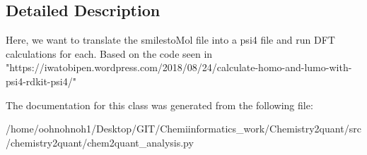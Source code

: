 \subsection{Detailed Description}
\begin{DoxyVerb}Here, we want to translate the smilestoMol file into a psi4 file and run DFT calculations for each.
Based on the code seen in "https://iwatobipen.wordpress.com/2018/08/24/calculate-homo-and-lumo-with-psi4-rdkit-psi4/"
\end{DoxyVerb}
 

The documentation for this class was generated from the following file\+:\begin{DoxyCompactItemize}
\item 
/home/oohnohnoh1/\+Desktop/\+G\+I\+T/\+Chemiinformatics\+\_\+work/\+Chemistry2quant/src/chemistry2quant/chem2quant\+\_\+analysis.\+py\end{DoxyCompactItemize}
